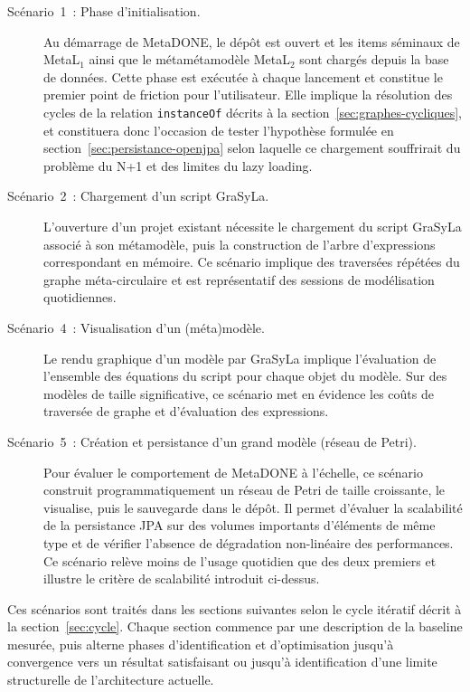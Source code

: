 \begin{description}
    \item[Scénario~1~: Phase d'initialisation.] Au démarrage de MetaDONE, le dépôt est ouvert et les items séminaux de MetaL$_1$ ainsi que le métamétamodèle MetaL$_2$ sont chargés depuis la base de données. Cette phase est exécutée à chaque lancement et constitue le premier point de friction pour l'utilisateur. Elle implique la résolution des cycles de la relation \texttt{instanceOf} décrits à la section~\ref{sec:graphes-cycliques}, et constituera donc l'occasion de tester l'hypothèse formulée en section~\ref{sec:persistance-openjpa} selon laquelle ce chargement souffrirait du problème du N+1 et des limites du lazy loading.

    \item[Scénario~2~: Chargement d'un script GraSyLa.] L'ouverture d'un
    projet existant nécessite le chargement du script GraSyLa associé à son
    métamodèle, puis la construction de l'arbre d'expressions correspondant
    en mémoire. Ce scénario implique des traversées répétées du graphe
    méta-circulaire et est représentatif des sessions de modélisation
    quotidiennes.

    \item[Scénario~4~: Visualisation d'un (méta)modèle.] Le rendu graphique d'un modèle par GraSyLa implique l'évaluation de l'ensemble des équations du script pour chaque objet du modèle. Sur des modèles de taille significative, ce scénario met en évidence les coûts de traversée de graphe et d'évaluation des expressions.

    \item[Scénario~5~: Création et persistance d'un grand modèle (réseau de Petri).] Pour évaluer le comportement de MetaDONE à l'échelle, ce scénario construit programmatiquement un réseau de Petri de taille croissante, le visualise, puis le sauvegarde dans le dépôt. Il permet d'évaluer la scalabilité de la persistance JPA sur des volumes importants d'éléments de même type et de vérifier l'absence de dégradation non-linéaire des performances. Ce scénario relève moins de l'usage quotidien que des deux premiers et illustre le critère de scalabilité introduit ci-dessus.
\end{description}

Ces scénarios sont traités dans les sections suivantes selon le cycle itératif décrit à la section~\ref{sec:cycle}. Chaque section commence par une description de la baseline mesurée, puis alterne phases d'identification et d'optimisation jusqu'à convergence vers un résultat satisfaisant ou jusqu'à identification d'une limite structurelle de l'architecture actuelle.